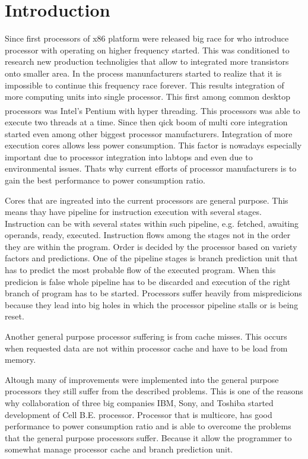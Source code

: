 \chapter{Introduction}

Since first processors of x86 platform were released big race for who introduce processor with operating on higher frequency started.
This was conditioned to research new production technoligies that allow to integrated more transistors onto smaller area.
In the process manunfacturers started to realize that it is impossible to continue this frequency race forever.
This results integration of more computing units into single processor.
This first among common desktop processors was Intel's Pentium\textsuperscript{\textregistered} with hyper threading.
This processors was able to execute two threads at a time.
Since then qick boom of multi core integration started even among other biggest processor manufacturers.
Integration of more execution cores allows less power consumption.
This factor is nowadays especially important due to processor integration into labtops and even due to environmental issues.
Thats why current efforts of processor manufacturers is to gain the best performance to power consumption ratio.

Cores that are ingreated into the current processors are general purpose.
This means thay have pipeline for instruction execution with several stages.
Instruction can be with several states within such pipeline, e.g. fetched, awaiting operands, ready, executed.
Instruction flows among the stages not in the order they are within the program.
Order is decided by the processor based on variety factors and predictions.
One of the pipeline stages is branch prediction unit that has to predict the most probable flow of the executed program.
When this predicion is false whole pipeline has to be discarded and execution of the right branch of program has to be started.
Processors suffer heavily from mispredicions because they lead into big holes in which the processor pipeline stalls or is being reset.

Another general purpose processor suffering is from cache misses.
This occurs when requested data are not within processor cache and have to be load from memory.

Altough many of improvements were implemented into the general purpose processors they still suffer from the described problems.
This is one of the reasons why collaboration of three big companies IBM, Sony, and Toshiba started development of Cell B.E. processor.
Processor that is multicore, has good performance to power consumption ratio and is able to overcome the problems that the general purpose processors suffer.
Because it allow the programmer to somewhat manage processor cache and branch prediction unit.

